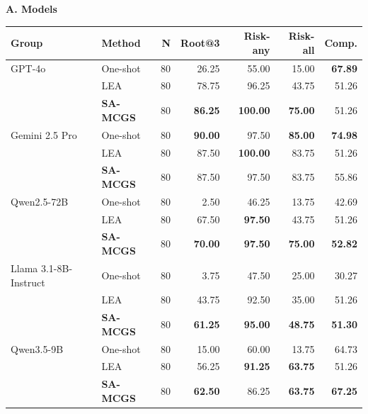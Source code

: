 \begin{table}[t]
\centering
\fontsize{7.5}{9}\selectfont
\setlength{\tabcolsep}{2pt}
\renewcommand{\arraystretch}{1.08}
\textbf{A. Models}\\[0.5mm]
\begin{tabular}{@{}llrrrrr@{}}
\toprule
Group & Method & N & Root@3 & Risk-any & Risk-all & Comp. \\
\midrule
GPT-4o & One-shot & 80 & 26.25 & 55.00 & 15.00 & \textbf{67.89} \\
 & LEA & 80 & 78.75 & 96.25 & 43.75 & 51.26 \\
 & \textbf{SA-MCGS} & 80 & \textbf{86.25} & \textbf{100.00} & \textbf{75.00} & 51.26 \\
\midrule
Gemini 2.5 Pro & One-shot & 80 & \textbf{90.00} & 97.50 & \textbf{85.00} & \textbf{74.98} \\
 & LEA & 80 & 87.50 & \textbf{100.00} & 83.75 & 51.26 \\
 & \textbf{SA-MCGS} & 80 & 87.50 & 97.50 & 83.75 & 55.86 \\
\midrule
Qwen2.5-72B & One-shot & 80 & 2.50 & 46.25 & 13.75 & 42.69 \\
 & LEA & 80 & 67.50 & \textbf{97.50} & 43.75 & 51.26 \\
 & \textbf{SA-MCGS} & 80 & \textbf{70.00} & \textbf{97.50} & \textbf{75.00} & \textbf{52.82} \\
\midrule
Llama 3.1-8B-Instruct & One-shot & 80 & 3.75 & 47.50 & 25.00 & 30.27 \\
 & LEA & 80 & 43.75 & 92.50 & 35.00 & 51.26 \\
 & \textbf{SA-MCGS} & 80 & \textbf{61.25} & \textbf{95.00} & \textbf{48.75} & \textbf{51.30} \\
\midrule
Qwen3.5-9B & One-shot & 80 & 15.00 & 60.00 & 13.75 & 64.73 \\
 & LEA & 80 & 56.25 & \textbf{91.25} & \textbf{63.75} & 51.26 \\
 & \textbf{SA-MCGS} & 80 & \textbf{62.50} & 86.25 & \textbf{63.75} & \textbf{67.25} \\
\bottomrule
\end{tabular}


\end{table}
